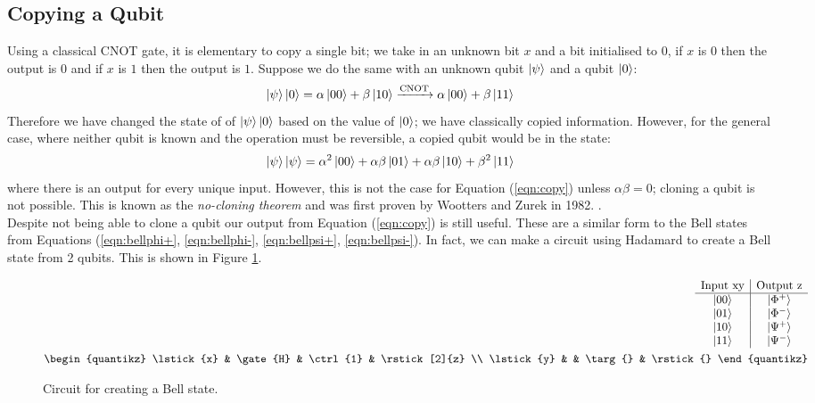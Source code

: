 \documentclass[reqno]{amsart}
\numberwithin{equation}{section}
\numberwithin{figure}{section}
\begin{document}
\subsection{Copying a Qubit}
\begin{justify}
    Using a classical CNOT gate, it is elementary to copy a single bit; we take in an unknown bit $x$ and a bit initialised to $0$, if $x$ is $0$ then the output is $0$ and if $x$ is $1$ then the output is $1$. Suppose we do the same with an unknown qubit $\ket{\psi}$ and a qubit $\ket{0}$:
    \begin{equation}
        \ket{\psi}\ket{0} = \alpha\ket{00} + \beta\ket{10} \xrightarrow{\text{CNOT}} \alpha\ket{00} + \beta\ket{11} \label{eqn:copy}
    \end{equation}
    Therefore we have changed the state of of $\ket{\psi}\ket{0}$ based on the value of $\ket{0}$; we have classically copied information. However, for the general case, where neither qubit is known and the operation must be reversible, a copied qubit would be in the state:
    \begin{equation}
        \ket{\psi}\ket{\psi} = \alpha^{2}\ket{00} + \alpha\beta\ket{01} + \alpha\beta\ket{10} + \beta^{2}\ket{11}
    \end{equation}
    where there is an output for every unique input. However, this is not the case for Equation (\ref{eqn:copy}) unless $\alpha\beta=0$; cloning a qubit is not possible. This is known as the \textit{no-cloning theorem} and was first proven by Wootters and Zurek in 1982. \cite{WoottersZurek1982}. \\

    Despite not being able to clone a qubit our output from Equation (\ref{eqn:copy}) is still useful. These are a similar form to the Bell states from Equations (\ref{eqn:bellphi+}, \ref{eqn:bellphi-}, \ref{eqn:bellpsi+}, \ref{eqn:bellpsi-}). In fact, we can make a circuit using Hadamard to create a Bell state from 2 qubits. This is shown in Figure \ref{fig:BellState}.
    \begin{figure}[h]
        \begin{eqnarray*}
            \begin{array}{c|c}
                \text{Input xy} & \text{Output z} \\ 
                \hline
                \ket{00} & \ket{\Phi^{+}} \\
                \ket{01} & \ket{\Phi^{-}} \\
                \ket{10} & \ket{\Psi^{+}} \\
                \ket{11} & \ket{\Psi^{-}}
            \end{array} \\
            \begin{quantikz}
                \lstick{x} & \gate{H} & \ctrl{1} & \rstick[2]{z} \\
                \lstick{y} & & \targ{} & \rstick{}
            \end{quantikz}
        \end{eqnarray*}
        \caption{Circuit for creating a Bell state.}
        \label{fig:BellState}
    \end{figure}
\end{justify}
\end{document}
